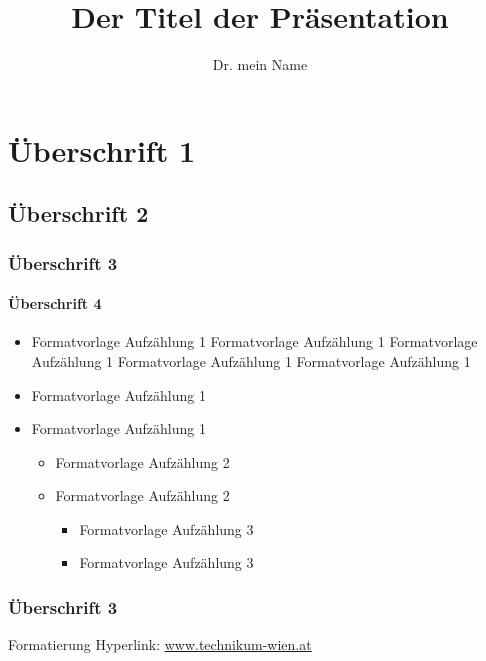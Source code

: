 \documentclass[MGS]{twbook}
\title{Der Titel der Präsentation}
\author{Dr. mein Name}
\begin{document}
\maketitle
\chapter*{Überschrift 1}
\blindtext

\section*{Überschrift 2}
\blindtext

\subsection*{Überschrift 3}
\blindtext

\subsubsection*{Überschrift 4}
\begin{itemize}
	\item Formatvorlage Aufzählung 1 Formatvorlage Aufzählung 1 Formatvorlage Aufzählung 1 Formatvorlage Aufzählung 1 Formatvorlage Aufzählung 1
	\item Formatvorlage Aufzählung 1
	\item Formatvorlage Aufzählung 1
	\begin{itemize}
		\item Formatvorlage Aufzählung 2
		\item Formatvorlage Aufzählung 2
		\begin{itemize}
			\item Formatvorlage Aufzählung 3
			\item Formatvorlage Aufzählung 3
		\end{itemize}
	\end{itemize}
\end{itemize}

\subsection*{Überschrift 3}
Formatierung Hyperlink: \href{www.technikum-wien.at}{www.technikum-wien.at}
\end{document}
